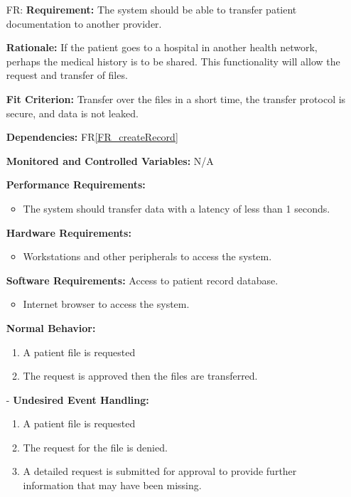 \documentclass[12pt]{article}
\newcounter{reqnum} %
\begin{document}
\begin{itemize}
  \item[FR\refstepcounter{reqnum}\thereqnum \label{FR_transferPatient}:] 
  \textbf{Requirement:} The system should be able to transfer patient documentation to another provider. 
  
  \textbf{Rationale:} If the patient goes to a hospital in another health network, perhaps the medical history is to be shared. This functionality will allow the request and transfer of files.
  
  \textbf{Fit Criterion:} Transfer over the files in a short time, the transfer protocol is secure, and data is not leaked.
  
  \textbf{Dependencies:} FR\ref{FR_createRecord}
  
  \textbf{Monitored and Controlled Variables:} N/A
  
  \textbf{Performance Requirements:}
  \begin{itemize}
    \item The system should transfer data with a latency of less than 1 seconds.
  \end{itemize}
  
  \textbf{Hardware Requirements:} 
  \begin{itemize}
    \item Workstations and other peripherals to access the system.
  \end{itemize}
  
  \textbf{Software Requirements:}
  Access to patient record database.
  \begin{itemize}
    \item Internet browser to access the system. 
  \end{itemize}
  
  \textbf{Normal Behavior:}
  \begin{enumerate}
    \item A patient file is requested
    \item The request is approved then the files are transferred.
  \end{enumerate}
  -
  \textbf{Undesired Event Handling:}
  \begin{enumerate}
    \item A patient file is requested 
    \item The request for the file is denied. 
    \item A detailed request is submitted for approval to provide further information that may have been missing.
  \end{enumerate}
  \end{itemize}
\end{document}
